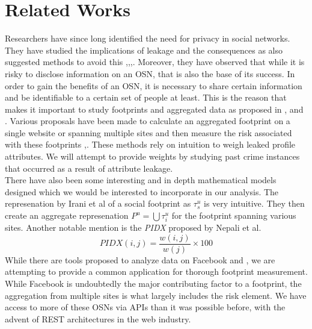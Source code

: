 \documentclass[conference]{IEEEtran}
\begin{document}
\section{Related Works}
Researchers have since long identified the need for privacy in social networks. They have studied the implications of leakage and the consequences as also suggested methods to avoid this \cite{emergingthreat},\cite{inforevelation},\cite{privacypaper},\cite{undermining}. Moreover, they have observed that while it is risky to disclose information on an OSN, that is also the base of its success. In order to gain the benefits of an OSN, it is necessary to share certain information and be identifiable to a certain set of people at least. This is the reason that makes it important to study footprints and aggregated data as proposed in \cite{emergingthreat},\cite{leakage} and \cite{paas}. Various proposals have been made to calculate an aggregated footprint on a single website or spanning multiple sites and then measure the risk associated with these footprints \cite{socialgraph},\cite{framework}. These methods rely on intuition to weigh leaked profile attributes. We will attempt to provide weights by studying past crime instances that occurred as a result of attribute leakage.\\

There have also been some interesting and in depth mathematical models designed which we would be interested to incorporate in our analysis. The represenation by Irani et al \cite{leakage} of a social footprint as \(\tau_{s}^{u}\) is very intuitive. They then create an aggregate represenation \(P^{u}=\bigcup\tau_{i}^{u}\) for the footprint spanning various sites. Another notable mention is the {\sl PIDX} proposed by Nepali et al. \cite{pidx}
\begin{equation}
PIDX(i,j) = \frac{w(i,j)}{w(j)}\times100
\end{equation}
While there are tools proposed to analyze data on Facebook \cite{privometer} and \cite{privaware}, we are attempting to provide a common application for thorough footprint measurement. While Facebook is undoubtedly the major contributing factor to a footprint, the aggregation from multiple sites is what largely includes the risk element. We have access to more of these OSNs via APIs than it was possible before, with the advent of REST architectures in the web industry.
\end{document}
